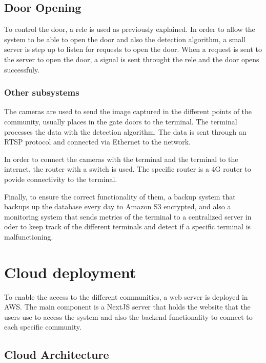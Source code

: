 
\subsection{Door Opening}

To control the door, a rele is used as previously explained. In order to allow the system to be able to open the door and also the detection algorithm, a small server is step up to listen for requests to open the door. When a request is sent to the server to open the door, a signal is sent throught the rele and the door opens successfuly.

\subsubsection{Other subsystems}

The cameras are used to send the image captured in the different points of the community, usually places in the gate doors to the terminal. The terminal processes the data with the detection algorithm. The data is sent through an RTSP  protocol and connected via Ethernet to the network.

In order to connect the cameras with the terminal and the terminal to the internet, the router with a switch is used. The specific router is a 4G router to povide connectivity to the terminal.

Finally, to ensure the correct functionality of them, a backup system that backups up the database every day to Amazon S3  encrypted, and also a monitoring system that sends metrics of the terminal to a centralized server in oder to keep track of the different terminals and detect if a specific terminal is malfunctioning.




\section{Cloud deployment}

To enable the access to the different communities, a web server is deployed in AWS. The main component is a NextJS server that holds the website that the users use to access the system and also the backend functionality to connect to each specific community.

\subsection{Cloud Architecture}

